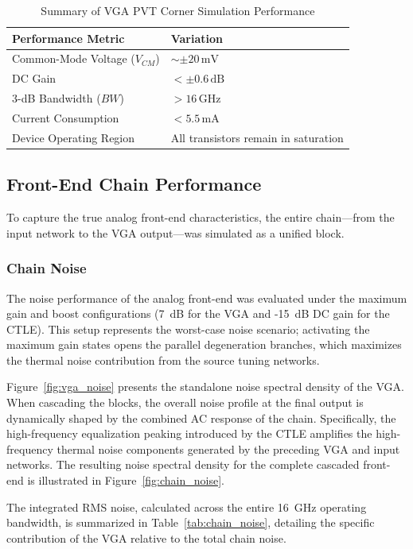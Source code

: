 \begin{table}[H]
    \centering
    \caption{Summary of VGA PVT Corner Simulation Performance}
    \label{tab:vga_corner_summary}
    \begin{tabular}{@{}ll@{}}
        \toprule
        \textbf{Performance Metric} & \textbf{Variation} \\
        \midrule
        Common-Mode Voltage ($V_{CM}$) & $\sim \pm 20\,\text{mV}$ \\
        DC Gain  & $< \pm 0.6\,\text{dB}$ \\
        3-dB Bandwidth ($BW$) & $> 16\,\text{GHz}$ \\
        Current Consumption  & $< 5.5\,\text{mA}$ \\
        Device Operating Region & All  transistors remain in saturation \\
        \bottomrule
    \end{tabular}
\end{table}

\subsection{Front-End Chain Performance}
To capture the true analog front-end characteristics, the entire chain—from the input network to the VGA output—was simulated as a unified block.

\subsubsection*{Chain Noise}
The noise performance of the analog front-end was evaluated under the maximum gain and boost configurations (7~dB for the VGA and -15~dB DC gain for the CTLE). This setup represents the worst-case noise scenario; activating the maximum gain states opens the parallel degeneration branches, which maximizes the thermal noise contribution from the source tuning networks.

Figure~\ref{fig:vga_noise} presents the standalone noise spectral density of the VGA. When cascading the blocks, the overall noise profile at the final output is dynamically shaped by the combined AC response of the chain. Specifically, the high-frequency equalization peaking introduced by the CTLE amplifies the high-frequency thermal noise components generated by the preceding VGA and input networks. The resulting noise spectral density for the complete cascaded front-end is illustrated in Figure~\ref{fig:chain_noise}.

The integrated RMS noise, calculated across the entire 16~GHz operating bandwidth, is summarized in Table~\ref{tab:chain_noise}, detailing the specific contribution of the VGA relative to the total chain noise.

